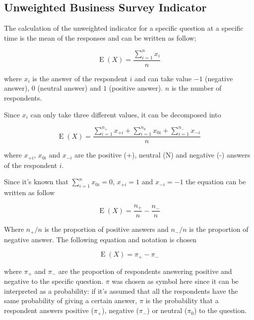 \documentclass[12pt,a4paper,oneside]{book}
\DeclareMathOperator{\E}{E}
\begin{document}
\subsection{Unweighted Business Survey Indicator}

The calculation of the unweighted indicator for a specific question at a specific time is the mean of the responses and can be written as follow;

\begin{equation}
    \E(X) = \frac{ \sum_{i=1}^n x_i}{n}
\end{equation} 

where 
$x_i$ is the answer of the respondent $i$ and can take value $-1$ (negative answer), $0$ (neutral answer) and $1$ (positive answer). 
$n$ is the number of respondents.

Since $x_i$ can only take three different values, it can be decomposed into

\begin{equation}
    \E(X) = \frac{ \sum_{i=1}^{n_+} x_{+i} + \sum_{i=1}^{n_0} x_{0i} + \sum_{i=1}^{n_-} x_{-i}}{n}
\end{equation} 


where 
$x_{+i}$, $x_{0i}$ and $x_{-i}$ are the positive (+), neutral (N) and negative (-) answers of the respondent $i$.

Since it's known that $\sum_{i=1}^n x_{0i} = 0$, $x_{+i} = 1$ and $x_{-i} = -1$ the equation can be written as follow

\begin{equation}
    \E(X) = \frac{n_+}{n}  - \frac{n_-}{n}
\end{equation} 

Where ${n_+}/{n}$ is the proportion of positive answers and ${n_-}/{n}$ is the proportion of negative answer. The following equation and notation is chosen

\begin{equation}
    \E(X) = \pi_+ - \pi_-  \label{eq: BSI Unweighted}
\end{equation}

where $\pi_+$ and $\pi_-$ are the proportion of respondents answering positive and negative to the specific question.
$\pi$ was chosen as symbol here since it can be interpreted as a probability: if it's assumed that all the respondents have the same probability of giving a certain answer, $\pi$ is the probability that a respondent answers positive ($\pi_+$), negative ($\pi_-$) or neutral ($\pi_0$) to the question. 
\end{document}
